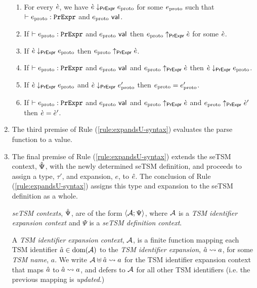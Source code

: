 \begin{enumerate}
\begingroup 
\def\thetheorem{\ref{condition:proto-expression-isomorphism}}
\begin{condition} ~
\begin{enumerate}
\item For every $\grave{e}$, we have $\grave{e} \downarrow_\mathsf{PrExpr} e_\text{proto}$ for some $e_\text{proto}$ such that $\vdash e_\text{proto} : \mathtt{PrExpr}$ and $e_\text{proto}~\mathsf{val}$.
\item If $\vdash e_\text{proto} : \mathtt{PrExpr}$ and $e_\text{proto}~\mathsf{val}$ then $e_\text{proto} \uparrow_\mathsf{PrExpr} \grave{e}$ for some $\grave{e}$.
\item If $\grave{e} \downarrow_\mathsf{PrExpr} e_\text{proto}$ then $e_\text{proto} \uparrow_\mathsf{PrExpr} \grave{e}$.
\item If $\vdash e_\text{proto} : \mathtt{PrExpr}$ and $e_\text{proto}~\mathsf{val}$ and $e_\text{proto} \uparrow_\mathsf{PrExpr} \grave{e}$ then $\grave{e} \downarrow_\mathsf{PrExpr} e_\text{proto}$.
\item If $\grave{e} \downarrow_\mathsf{PrExpr} e_\text{proto}$ and $\grave{e} \downarrow_\mathsf{PrExpr} e_\text{proto}'$ then $e_\text{proto}=e_\text{proto}'$.
\item If $\vdash e_\text{proto} : \mathtt{PrExpr}$ and $e_\text{proto}~\mathsf{val}$ and $e_\text{proto} \uparrow_\mathsf{PrExpr} \grave{e}$ and $e_\text{proto} \uparrow_\mathsf{PrExpr} \grave{e}'$ then $\grave{e}=\grave{e}'$.
\end{enumerate}
\end{condition}
\endgroup

\item The third premise of Rule (\ref{rule:expandsU-syntax}) evaluates the parse function to a value.
\item The final premise of Rule (\ref{rule:expandsU-syntax}) extends the seTSM context, $\hat{\Psi}$, with the newly determined {seTSM definition}, and proceeds to assign a type, $\tau'$, and expansion, $e$, to ${\hat e}$. The conclusion of Rule (\ref{rule:expandsU-syntax}) assigns this type and expansion to the seTSM definition as a whole.%



\emph{seTSM contexts}, $\hat{\Psi}$, are of the form $\langle \mathcal{A}; \Psi \rangle$, where $\mathcal{A}$ is a \emph{TSM identifier expansion context} and $\Psi$ is a \emph{seTSM definition context}. 

A \emph{TSM identifier expansion context}, $\mathcal{A}$, is a finite function mapping each TSM identifier $\hat{a} \in \text{dom}(\mathcal{A})$ to the \emph{TSM identifier expansion}, $\hat{a} \leadsto a$, for some \emph{TSM name}, $a$. We write $\mathcal{A} \uplus \hat{a} \leadsto a$ for the TSM identifier expansion context that maps $\hat{a}$ to $\hat{a} \leadsto a$, and defers to $\mathcal{A}$ for all other TSM identifiers (i.e. the previous mapping is \emph{updated}.)


\end{enumerate}
